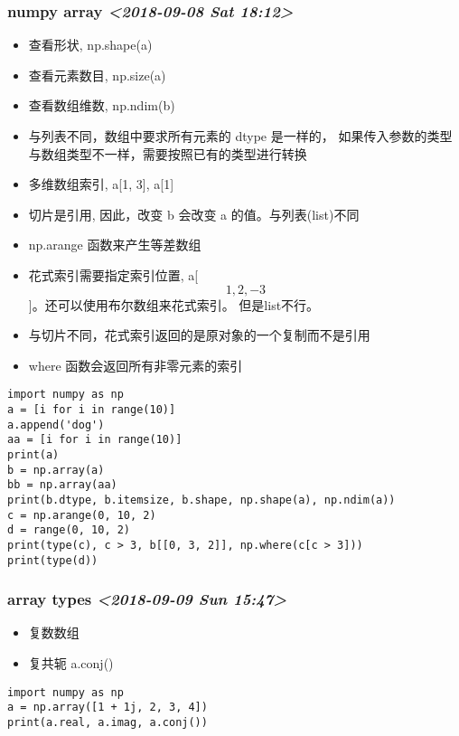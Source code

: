 \documentclass[11pt]{article}
\begin{document}
\subsubsection{numpy array \textit{<2018-09-08 Sat 18:12>}}
\label{sec:org088bd5a}
\begin{itemize}
\item 查看形状, np.shape(a)
\item 查看元素数目, np.size(a)
\item 查看数组维数, np.ndim(b)
\item 与列表不同，数组中要求所有元素的 dtype 是一样的，
如果传入参数的类型与数组类型不一样，需要按照已有的类型进行转换
\item 多维数组索引, a[1, 3], a[1]
\item 切片是引用, 因此，改变 b 会改变 a 的值。与列表(list)不同
\item np.arange 函数来产生等差数组
\item 花式索引需要指定索引位置, a[\[1, 2, -3\]]。还可以使用布尔数组来花式索引。
但是list不行。
\item 与切片不同，花式索引返回的是原对象的一个复制而不是引用
\item where 函数会返回所有非零元素的索引
\end{itemize}
\begin{verbatim}
import numpy as np
a = [i for i in range(10)]
a.append('dog')
aa = [i for i in range(10)]
print(a)
b = np.array(a)
bb = np.array(aa)
print(b.dtype, b.itemsize, b.shape, np.shape(a), np.ndim(a))
c = np.arange(0, 10, 2)
d = range(0, 10, 2)
print(type(c), c > 3, b[[0, 3, 2]], np.where(c[c > 3]))
print(type(d))
\end{verbatim}
\subsubsection{array types \textit{<2018-09-09 Sun 15:47>}}
\label{sec:org0f4876b}
\begin{itemize}
\item 复数数组
\item 复共轭 a.conj()
\end{itemize}
\begin{verbatim}
import numpy as np
a = np.array([1 + 1j, 2, 3, 4])
print(a.real, a.imag, a.conj())
\end{verbatim}
\end{document}
